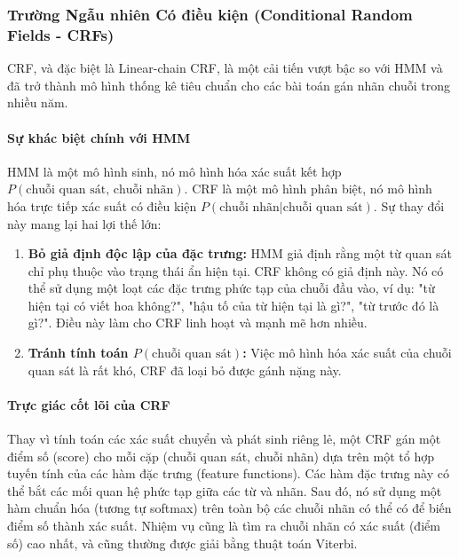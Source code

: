 \subsubsection{Trường Ngẫu nhiên Có điều kiện (Conditional Random Fields - CRFs)}
CRF, và đặc biệt là Linear-chain CRF, là một cải tiến vượt bậc so với HMM và đã trở thành mô hình thống kê tiêu chuẩn cho các bài toán gán nhãn chuỗi trong nhiều năm.

\paragraph{Sự khác biệt chính với HMM}
HMM là một mô hình sinh, nó mô hình hóa xác suất kết hợp $P(\text{chuỗi quan sát, chuỗi nhãn})$. CRF là một mô hình phân biệt, nó mô hình hóa trực tiếp xác suất có điều kiện $P(\text{chuỗi nhãn}|\text{chuỗi quan sát})$.
Sự thay đổi này mang lại hai lợi thế lớn:
\begin{enumerate}
    \item \textbf{Bỏ giả định độc lập của đặc trưng:} HMM giả định rằng một từ quan sát chỉ phụ thuộc vào trạng thái ẩn hiện tại. CRF không có giả định này. Nó có thể sử dụng một loạt các đặc trưng phức tạp của chuỗi đầu vào, ví dụ: "từ hiện tại có viết hoa không?", "hậu tố của từ hiện tại là gì?", "từ trước đó là gì?". Điều này làm cho CRF linh hoạt và mạnh mẽ hơn nhiều.
    \item \textbf{Tránh tính toán $P(\text{chuỗi quan sát})$:} Việc mô hình hóa xác suất của chuỗi quan sát là rất khó, CRF đã loại bỏ được gánh nặng này.
\end{enumerate}

\paragraph{Trực giác cốt lõi của CRF}
Thay vì tính toán các xác suất chuyển và phát sinh riêng lẻ, một CRF gán một điểm số (score) cho mỗi cặp (chuỗi quan sát, chuỗi nhãn) dựa trên một tổ hợp tuyến tính của các hàm đặc trưng (feature functions). Các hàm đặc trưng này có thể bắt các mối quan hệ phức tạp giữa các từ và nhãn. Sau đó, nó sử dụng một hàm chuẩn hóa (tương tự softmax) trên toàn bộ các chuỗi nhãn có thể có để biến điểm số thành xác suất. Nhiệm vụ cũng là tìm ra chuỗi nhãn có xác suất (điểm số) cao nhất, và cũng thường được giải bằng thuật toán Viterbi.

